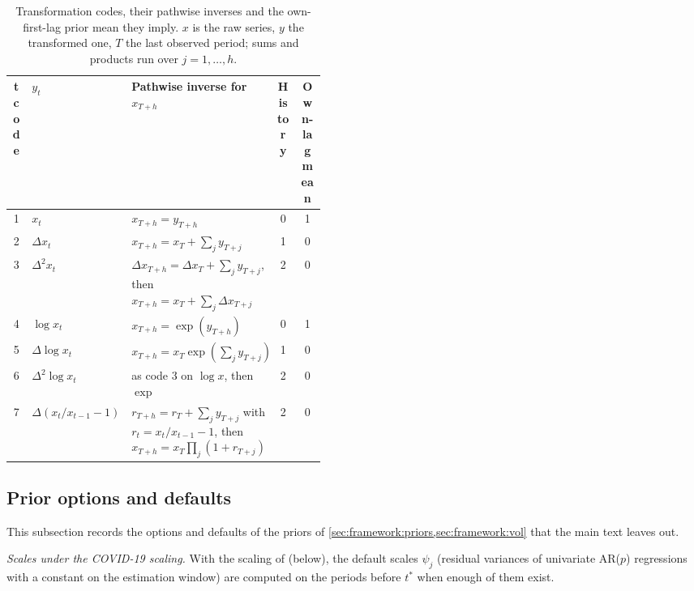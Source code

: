 \begin{table}[!htbp]
\centering\small
\caption{Transformation codes, their pathwise inverses and the own-first-lag prior mean they imply.
$x$ is the raw series, $y$ the transformed one, $T$ the last observed period; sums and products run
over $j = 1, \dots, h$.}
\label{tab:tcodes}
\begin{tabular}{@{}clp{0.45\linewidth}cc@{}}
\toprule
tcode & $y_t$ & Pathwise inverse for $x_{T+h}$ & History & Own-lag mean \\
\midrule
1 & $x_t$ & $x_{T+h} = y_{T+h}$ & 0 & 1 \\
2 & $\Delta x_t$ & $x_{T+h} = x_T + \sum_j y_{T+j}$ & 1 & 0 \\
3 & $\Delta^2 x_t$ & $\Delta x_{T+h} = \Delta x_T + \sum_j y_{T+j}$, then $x_{T+h} = x_T + \sum_j \Delta x_{T+j}$ & 2 & 0 \\
4 & $\log x_t$ & $x_{T+h} = \exp(y_{T+h})$ & 0 & 1 \\
5 & $\Delta \log x_t$ & $x_{T+h} = x_T \exp(\sum_j y_{T+j})$ & 1 & 0 \\
6 & $\Delta^2 \log x_t$ & as code 3 on $\log x$, then $\exp$ & 2 & 0 \\
7 & $\Delta(x_t/x_{t-1} - 1)$ & $r_{T+h} = r_T + \sum_j y_{T+j}$ with $r_t = x_t/x_{t-1} - 1$, then $x_{T+h} = x_T \prod_j (1 + r_{T+j})$ & 2 & 0 \\
\bottomrule
\end{tabular}
\end{table}

\subsection{Prior options and defaults}\label{app:prior-details}

This subsection records the options and defaults of the priors of \cref{sec:framework:priors,sec:framework:vol}
that the main text leaves out.

\emph{Scales under the COVID-19 scaling.}
With the scaling of \citet{lenza2022estimate} (below), the default scales $\psi_j$ (residual variances of
univariate AR($p$) regressions with a constant on the estimation window) are computed on the
periods before $t^*$ when enough of them exist. %


